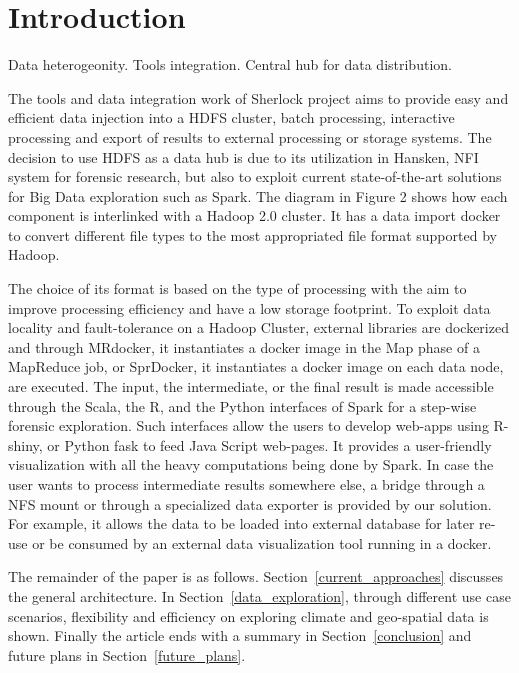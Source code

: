 \section{Introduction}
\label{introduction}

Data heterogeonity.
Tools integration.
Central hub for data distribution.

The tools and data integration work of Sherlock project aims to provide easy and efficient data injection
into a HDFS cluster, batch processing, interactive processing and export of results to external processing
or storage systems. The decision to use HDFS as a data hub is due to its utilization in Hansken, NFI system
for forensic research, but also to exploit current state-of-the-art solutions for Big Data exploration such
as Spark. The diagram in Figure 2 shows how each component is interlinked with a Hadoop 2.0 cluster. It has
a data import docker to convert different file types to the most appropriated file format supported by Hadoop.

The choice of its format is based on the type of processing with the aim to improve processing efficiency
and have a low storage footprint. To exploit data locality and fault-tolerance on a Hadoop Cluster, external
libraries are dockerized and through MRdocker, it instantiates a docker image in the Map phase of a MapReduce
job, or SprDocker, it instantiates a docker image on each data node, are executed. The input, the intermediate,
or the final result is made accessible through the Scala, the R, and the Python interfaces of Spark for a
step-wise forensic exploration. Such interfaces allow the users to develop web-apps using R-shiny, or Python
fask to feed Java Script web-pages. It provides a user-friendly visualization with all the heavy computations
being done by Spark. In case the user wants to process intermediate results somewhere else, a bridge through
a NFS mount or through a specialized data exporter is provided by our solution. For example, it allows the
data to be loaded into external database for later re-use or be consumed by an external data visualization
tool running in a docker. 

The remainder of the paper is as follows. Section~\ref{current_approaches} discusses the general
architecture. In Section~\ref{data_exploration}, through different use case scenarios, flexibility
and efficiency on exploring climate and geo-spatial data is shown. Finally the article ends with
a summary in Section~\ref{conclusion} and future plans in Section~\ref{future_plans}.
